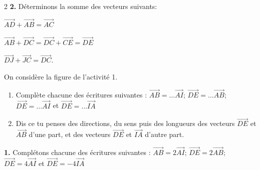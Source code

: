 \begin{multicols*}{2}
  	\textbf{2.} Déterminons la somme des vecteurs suivants:
  	
  	$\overrightarrow{AD}+\overrightarrow{AB}=\overrightarrow{AC}$
  	
  	$\overrightarrow{AB}+\overrightarrow{DC}=\overrightarrow{DC}+\overrightarrow{CE}=\overrightarrow{DE}$ 
  	
  	$\overrightarrow{DJ}+\overrightarrow{JC}=\overrightarrow{DC}$.
  	
  	
  	On considère la figure de l'activité 1.
  	\begin{enumerate}
  		\item Complète chacune des écritures suivantes : $\overrightarrow{AB}= \dots \overrightarrow{AI}$; $\overrightarrow{DE}= \dots \overrightarrow{AB}$;  $\overrightarrow{DE}= \dots \overrightarrow{AI}$ et $\overrightarrow{DE}= \dots \overrightarrow{IA}$ 
  		\item Dis ce tu penses des directions, du sens puis des longueurs des 
  		vecteurs $\overrightarrow{DE}$ et  $ \overrightarrow{AB}$  d’une part, et des vecteurs $\overrightarrow{DE}$ et $ \overrightarrow{IA}$ d’autre 
  		part.
  		
  	\end{enumerate}
  	\dure 
  	\resul
  	\textbf{1.} Complétons chacune des écritures suivantes : $\overrightarrow{AB}= 2 \overrightarrow{AI}$; $\overrightarrow{DE}= 2 \overrightarrow{AB}$;  $\overrightarrow{DE}= 4 \overrightarrow{AI}$ et $\overrightarrow{DE}= -4 \overrightarrow{IA}$ 
  	

\end{multicols*}
